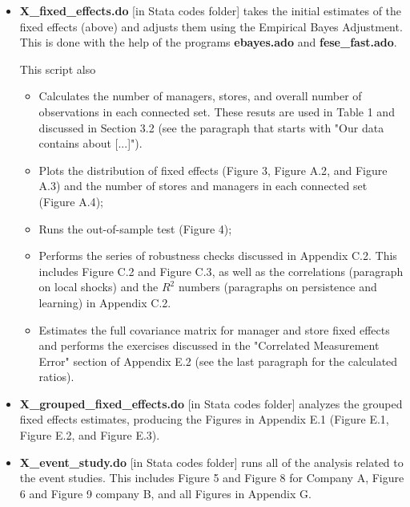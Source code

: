 \documentclass[
]{article}
\begin{document}
\begin{itemize}
    \item \textbf{X\_fixed\_effects.do} [in Stata codes folder] takes the initial estimates of the fixed effects (above) and adjusts them using the Empirical Bayes Adjustment. This is done with the help of the programs \textbf{ebayes.ado} and \textbf{fese\_fast.ado}.

    This script also
        \begin{itemize}
            \item Calculates the number of managers, stores, and overall number of observations in each connected set. These resuts are used in {\color{blue}Table 1} and discussed in {\color{blue}Section 3.2} (see the paragraph that starts with "Our data contains about [...]").
            \item Plots the distribution of fixed effects ({\color{blue}Figure 3}, {\color{blue}Figure A.2}, and {\color{blue}Figure A.3}) and the number of stores and managers in each connected set ({\color{blue}Figure A.4});
            \item Runs the out-of-sample test ({\color{blue}Figure 4});
            \item Performs the series of robustness checks discussed in {\color{blue}Appendix C.2}. This includes {\color{blue}Figure C.2} and {\color{blue}Figure C.3}, as well as the correlations (paragraph on local shocks) and the $R^2$ numbers (paragraphs on persistence and learning) in {\color{blue}Appendix C.2}.
            \item Estimates the full covariance matrix for manager and store fixed effects and performs the exercises discussed in the "Correlated Measurement Error" section of {\color{blue}Appendix E.2} (see the last paragraph for the calculated ratios).
        \end{itemize}
        
    \item \textbf{X\_grouped\_fixed\_effects.do} [in Stata codes folder] analyzes the grouped fixed effects estimates, producing the Figures in {\color{blue}Appendix E.1} ({\color{blue}Figure E.1}, {\color{blue}Figure E.2}, and {\color{blue}Figure E.3}).

    \item \textbf{X\_event\_study.do} [in Stata codes folder] runs all of the analysis related to the event studies. This includes {\color{blue}Figure 5} and {\color{blue}Figure 8} for Company A, {\color{blue}Figure 6} and {\color{blue}Figure 9} company B, and all Figures in {\color{blue}Appendix G}. 


\end{itemize}
\end{document}
